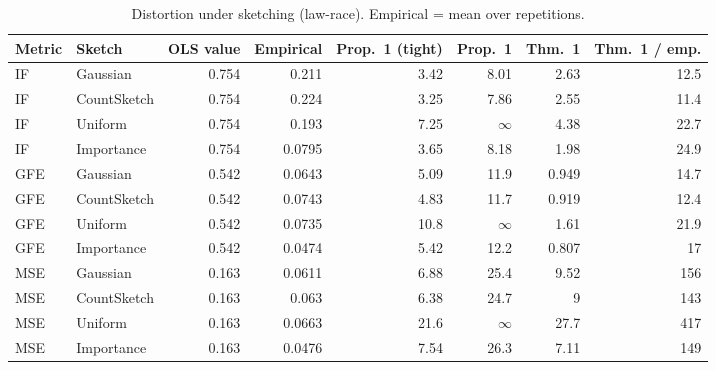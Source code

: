 \begin{table}[t]
\centering
\small
\begin{tabular}{llrrrrrr}
\toprule
Metric & Sketch & OLS value & Empirical & Prop.~1 (tight) & Prop.~1 & Thm.~1 & Thm.~1 / emp. \\
\midrule
IF & Gaussian & 0.754 & 0.211 & 3.42 & 8.01 & 2.63 & 12.5 \\
IF & CountSketch & 0.754 & 0.224 & 3.25 & 7.86 & 2.55 & 11.4 \\
IF & Uniform & 0.754 & 0.193 & 7.25 & $\infty$ & 4.38 & 22.7 \\
IF & Importance & 0.754 & 0.0795 & 3.65 & 8.18 & 1.98 & 24.9 \\
\midrule
GFE & Gaussian & 0.542 & 0.0643 & 5.09 & 11.9 & 0.949 & 14.7 \\
GFE & CountSketch & 0.542 & 0.0743 & 4.83 & 11.7 & 0.919 & 12.4 \\
GFE & Uniform & 0.542 & 0.0735 & 10.8 & $\infty$ & 1.61 & 21.9 \\
GFE & Importance & 0.542 & 0.0474 & 5.42 & 12.2 & 0.807 & 17 \\
\midrule
MSE & Gaussian & 0.163 & 0.0611 & 6.88 & 25.4 & 9.52 & 156 \\
MSE & CountSketch & 0.163 & 0.063 & 6.38 & 24.7 & 9 & 143 \\
MSE & Uniform & 0.163 & 0.0663 & 21.6 & $\infty$ & 27.7 & 417 \\
MSE & Importance & 0.163 & 0.0476 & 7.54 & 26.3 & 7.11 & 149 \\
\bottomrule
\end{tabular}
\caption{Distortion under sketching (law-race). Empirical = mean over repetitions.}
\label{tab:law-race}
\end{table}